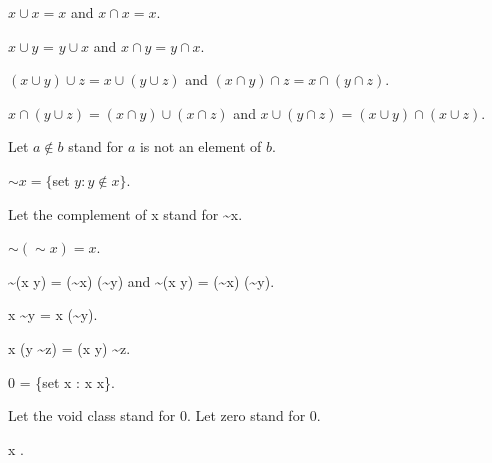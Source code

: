 \documentclass[a4paper,draft]{amsproc}
\begin{document}
\begin{forthel}
\begin{theorem}[5]
$x \cup x = x$ and $x \cap x = x$.
\end{theorem}

\begin{theorem}[6]
$x \cup y$ = $y \cup x$ and $x \cap y = y \cap x$.
\end{theorem}

\begin{theorem}[7]
$(x \cup y) \cup z = x \cup (y \cup z)$ 
and $(x \cap y) \cap z = x \cap (y \cap z)$.
\end{theorem}

\begin{theorem}[8]
$x \cap (y \cup z) = (x \cap y) \cup (x \cap z)$
and $x \cup (y \cap z) = (x \cup y) \cap (x \cup z)$.
\end{theorem}

Let $a \notin b$ stand for $a$ is not an element of $b$.

\begin{definition}[10] 
$\sim x = \{$set $y : y \notin x\}$.
\end{definition}
Let the complement of x stand for \sim x.

\begin{theorem}[11]
$\sim (\sim x) = x$.
\end{theorem}

\begin{theorem}[12]
\sim (x \cup y) = (\sim x) \cap (\sim y) 
and \sim (x \cap y) = (\sim x) \cup (\sim y).
\end{theorem}

\begin{definition}[13] x \sim y = x \cap (\sim y).\end{definition}

\begin{theorem}[14]
x \cap (y \sim z) = (x \cap y) \sim z.
\end{theorem}

\begin{definition}[15] 
0 = \{set x : x \neq x\}.
\end{definition}
Let the void class stand for 0.
Let zero stand for 0.

\begin{theorem}[16]
x .
\end{theorem}


\end{forthel}
\end{document}
